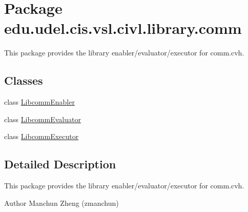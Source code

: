 \hypertarget{namespaceedu_1_1udel_1_1cis_1_1vsl_1_1civl_1_1library_1_1comm}{}\section{Package edu.\+udel.\+cis.\+vsl.\+civl.\+library.\+comm}
\label{namespaceedu_1_1udel_1_1cis_1_1vsl_1_1civl_1_1library_1_1comm}


This package provides the library enabler/evaluator/executor for comm.\+cvh.  


\subsection*{Classes}
\begin{DoxyCompactItemize}
\item 
class \hyperlink{classedu_1_1udel_1_1cis_1_1vsl_1_1civl_1_1library_1_1comm_1_1LibcommEnabler}{Libcomm\+Enabler}
\item 
class \hyperlink{classedu_1_1udel_1_1cis_1_1vsl_1_1civl_1_1library_1_1comm_1_1LibcommEvaluator}{Libcomm\+Evaluator}
\item 
class \hyperlink{classedu_1_1udel_1_1cis_1_1vsl_1_1civl_1_1library_1_1comm_1_1LibcommExecutor}{Libcomm\+Executor}
\end{DoxyCompactItemize}


\subsection{Detailed Description}
This package provides the library enabler/evaluator/executor for comm.\+cvh. 

\begin{DoxyAuthor}{Author}
Manchun Zheng (zmanchun) 
\end{DoxyAuthor}
